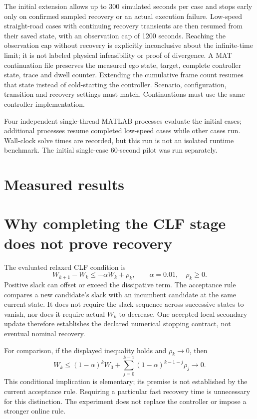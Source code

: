 \documentclass[11pt]{article}
\begin{document}
The initial extension allows up to 300 simulated seconds per case and stops
early only on confirmed sampled recovery or an actual execution failure.
Low-speed straight-road cases with continuing recovery transients are then
resumed from their saved state, with an observation cap of 1200 seconds.
Reaching the observation cap without recovery is explicitly inconclusive
about the infinite-time limit; it is not labeled physical infeasibility or
proof of divergence. A MAT continuation file preserves the measured ego
state, target, complete controller state, trace and dwell counter. Extending
the cumulative frame count resumes that state instead of cold-starting the
controller. Scenario, configuration, transition and recovery settings must
match. Continuations must use the same controller implementation.

Four independent single-thread MATLAB processes evaluate the initial cases;
additional processes resume completed low-speed cases while other cases run.
Wall-clock solve times are recorded, but this run is not an isolated runtime
benchmark. The initial single-case 60-second pilot was run separately.

\section{Measured results}


\section{Why completing the CLF stage does not prove recovery}
The evaluated relaxed CLF condition is
\[
W_{k+1}-W_k\le-\alpha W_k+\rho_k,\qquad
\alpha=0.01,\quad \rho_k\ge0.
\]
Positive slack can offset or exceed the dissipative term. The acceptance rule
compares a new candidate's slack with an incumbent candidate at the same
current state. It does not require the slack sequence across successive
states to vanish, nor does it require actual $W_k$ to decrease.
One accepted local secondary update therefore establishes the declared
numerical stopping contract, not eventual nominal recovery.

For comparison, if the displayed inequality holds and $\rho_k\to0$, then
\[
W_k\le(1-\alpha)^k W_0+
\sum_{j=0}^{k-1}(1-\alpha)^{k-1-j}\rho_j\to0.
\]
This conditional implication is elementary; its premise is not established
by the current acceptance rule. Requiring a particular fast recovery time is
unnecessary for this distinction. The experiment does not replace the
controller or impose a stronger online rule.
\end{document}
